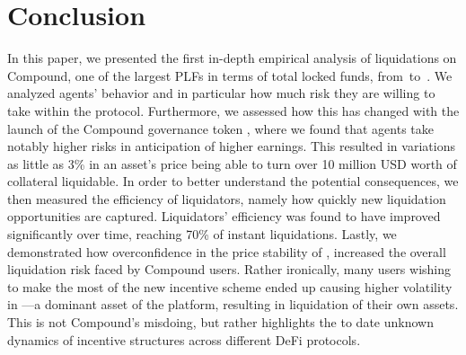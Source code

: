 \section{Conclusion}
\label{sec:conclusion}
In this paper, we presented the first in-depth empirical analysis of liquidations on Compound, one of the largest PLFs in terms of total locked funds, from~\StartDate to~\EndDate.
We analyzed agents' behavior and in particular how much risk they are willing to take within the protocol.
Furthermore, we assessed how this has changed with the launch of the Compound governance token , where we found that agents take notably higher risks in anticipation of higher earnings.
This resulted in variations as little as 3\% in an asset's price being able to turn over 10 million USD worth of collateral liquidable.
In order to better understand the potential consequences, we then measured the efficiency of liquidators, namely how quickly new liquidation opportunities are captured. Liquidators' efficiency was found to have improved significantly over time, reaching 70\% of instant liquidations.
Lastly, we demonstrated how overconfidence in the price stability of , increased the overall liquidation risk faced by Compound users.
Rather ironically, many users wishing to make the most of the new incentive scheme ended up causing higher volatility in ---a dominant asset of the platform, resulting in liquidation of their own assets.
This is not Compound's misdoing, but rather highlights the to date unknown dynamics of incentive structures across different DeFi protocols.